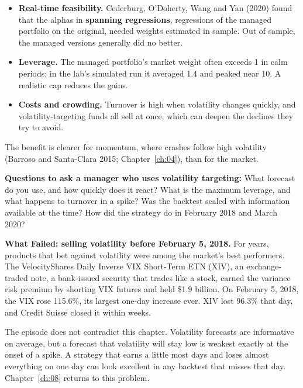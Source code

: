 \begin{itemize}
  \item \textbf{Real-time feasibility.} Cederburg, O'Doherty, Wang and Yan (2020) found that the alphas in \textbf{spanning regressions}, regressions of the managed portfolio on the original, needed weights estimated in sample. Out of sample, the managed versions generally did no better.
  \item \textbf{Leverage.} The managed portfolio's market weight often exceeds 1 in calm periods; in the lab's simulated run it averaged 1.4 and peaked near 10. A realistic cap reduces the gains.
  \item \textbf{Costs and crowding.} Turnover is high when volatility changes quickly, and volatility-targeting funds all sell at once, which can deepen the declines they try to avoid.
\end{itemize}

The benefit is clearer for momentum, where crashes follow high volatility (Barroso and Santa-Clara 2015; Chapter~\ref{ch:04}), than for the market.

\textbf{Questions to ask a manager who uses volatility targeting:} What forecast do you use, and how quickly does it react? What is the maximum leverage, and what happens to turnover in a spike? Was the backtest scaled with information available at the time? How did the strategy do in February 2018 and March 2020?

\begin{callout}
\textbf{What Failed: selling volatility before February 5, 2018.} For years, products that bet against volatility were among the market's best performers. The VelocityShares Daily Inverse VIX Short-Term ETN (XIV), an exchange-traded note, a bank-issued security that trades like a stock, earned the variance risk premium by shorting VIX futures and held \$1.9 billion. On February 5, 2018, the VIX rose 115.6\%, its largest one-day increase ever. XIV lost 96.3\% that day, and Credit Suisse closed it within weeks.

The episode does not contradict this chapter. Volatility forecasts are informative on average, but a forecast that volatility will stay low is weakest exactly at the onset of a spike. A strategy that earns a little most days and loses almost everything on one day can look excellent in any backtest that misses that day. Chapter~\ref{ch:08} returns to this problem.
\end{callout}
